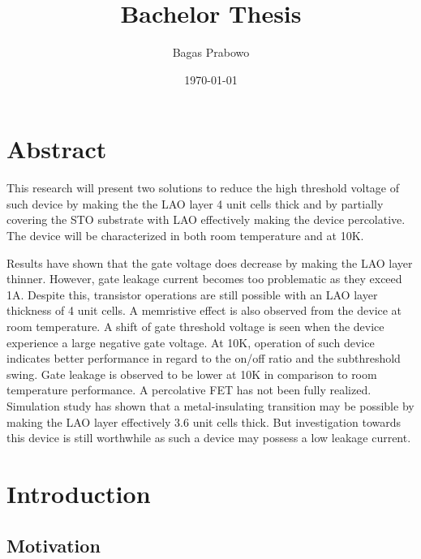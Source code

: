\documentclass[11pt,a4paper]{report}
\title{Bachelor Thesis} %
\author{Bagas Prabowo}
\date{\today}
\begin{document}
\maketitle

\chapter*{Abstract}

This research will present two solutions to reduce the high threshold voltage of such device by making the the LAO layer 4 unit cells thick and by partially covering the STO substrate with LAO effectively making the device percolative. The device will be characterized in both room temperature and at 10K.

Results have shown that the gate voltage does decrease by making the LAO layer thinner. However, gate leakage current becomes too problematic as they exceed 1A. Despite this, transistor operations are still possible with an LAO layer thickness of 4 unit cells. A memristive effect is also observed from the device at room temperature. A shift of gate threshold voltage is seen when the device experience a large negative gate voltage.  At 10K, operation of such device indicates better performance in regard to the on/off  ratio and the subthreshold swing. Gate leakage is observed to be lower at 10K in comparison to room temperature performance. 
A percolative FET has not been fully realized. Simulation study has shown that a metal-insulating transition may be possible by making the LAO layer effectively 3.6 unit cells thick. But investigation towards this device is still worthwhile as such a device may possess a low leakage current.

\newpage
\tableofcontents
\chapter{Introduction}


\section{Motivation}



\end{document}
